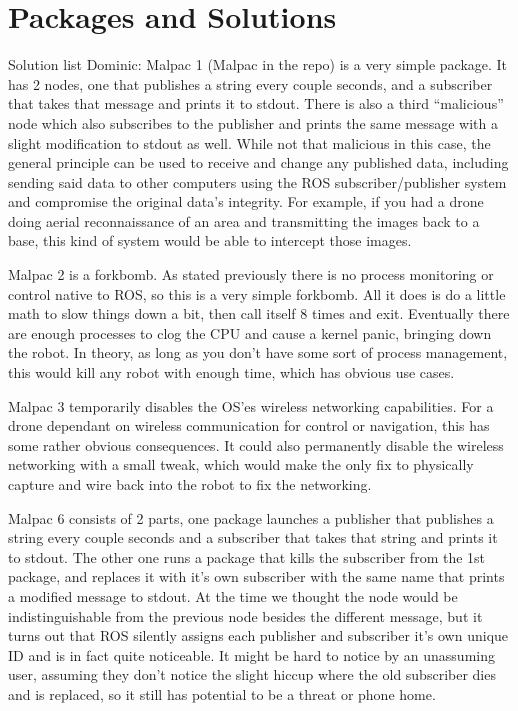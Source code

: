\documentclass[IEEEtran,letterpaper,10pt,notitlepage,draftclsnofoot,onecolumn]{article}
\begin{document}
\section{Packages and Solutions}
Solution list Dominic:
Malpac 1 (Malpac in the repo) is a very simple package. It has 2 nodes, one that publishes a string every couple seconds, and a subscriber that takes that message and prints it to stdout. 
There is also a third “malicious” node which also subscribes to the publisher and prints the same message with a slight modification to stdout as well. 
While not that malicious in this case, the general principle can be used to receive and change any published data, including sending said data to other computers using the ROS subscriber/publisher system and compromise the original data’s integrity. 
For example, if you had a drone doing aerial reconnaissance of an area and transmitting the images back to a base, this kind of system would be able to intercept those images.

Malpac 2 is a forkbomb. 
As stated previously there is no process monitoring or control native to ROS, so this is a very simple forkbomb. All it does is do a little math to slow things down a bit, then call itself 8 times and exit. 
Eventually there are enough processes to clog the CPU and cause a kernel panic, bringing down the robot. 
In theory, as long as you don’t have some sort of process management, this would kill any robot with enough time, which has obvious use cases.

Malpac 3 temporarily disables the OS’es wireless networking capabilities. 
For a drone dependant on wireless communication for control or navigation, this has some rather obvious consequences. 
It could also permanently disable the wireless networking with a small tweak, which would make the only fix to physically capture and wire back into the robot to fix the networking. 

Malpac 6 consists of 2 parts, one package launches a publisher that publishes a string every couple seconds and a subscriber that takes that string and prints it to stdout. 
The other one runs a package that kills the subscriber from the 1st package, and replaces it with it’s own subscriber with the same name that prints a modified message to stdout. 
At the time we thought the node would be indistinguishable from the previous node besides the different message, but it turns out that ROS silently assigns each publisher and subscriber it’s own unique ID and is in fact quite noticeable. 
It might be hard to notice by an unassuming user, assuming they don’t notice the slight hiccup where the old subscriber dies and is replaced, so it still has potential to be a threat or phone home.
\end{document}
